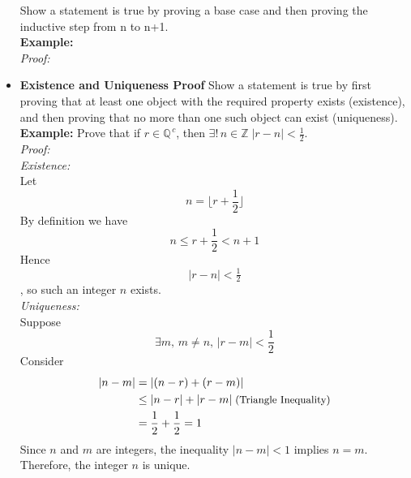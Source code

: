\documentclass[11pt]{article}
\begin{document}
\begin{itemize}
        Show a statement is true by proving a base case and then proving the inductive step from n to n+1.\\[.5em]
        \textbf{Example:}\\
        \textit{Proof:}\\
    \item\textbf{Existence and Uniqueness Proof}
        Show a statement is true by first proving that at least one object with the required property exists (existence), and then proving that no more than one such object can exist (uniqueness).\\[.5em]
        \textbf{Example:} Prove that if $\displaystyle r \in \mathbb{Q}^{\,c}$, then $\displaystyle\exists !\, n \in \mathbb{Z} \;|r-n| < \frac{1}{2}$.\\
        \textit{Proof:}\\
        \emph{Existence:}\\
        Let 
        \[
            n = \lfloor r + \frac{1}{2} \rfloor
        \]
        By definition we have
        \[
            n \leq r + \frac{1}{2}< n + 1
        \]
        Hence \[|r-n| < \tfrac{1}{2}\], so such an integer $n$ exists.\\
        \emph{Uniqueness: }\\
        Suppose
        \[
            \exists m,\, m\neq n,\,|r-m|<\frac{1}{2}
        \]
        Consider
        \begin{align*} 
            |n-m| &= |(n-r)+(r-m)|\\
            &\leq|n-r| + |r-m|\;\text{\small (Triangle Inequality)}\\
            &=\frac{1}{2}+\frac{1}{2}=1
        \end{align*}
        Since $n$ and $m$ are integers, the inequality $|n-m| < 1$ implies $n = m$. Therefore, the integer $n$ is unique.
\end{itemize}
\end{document}
